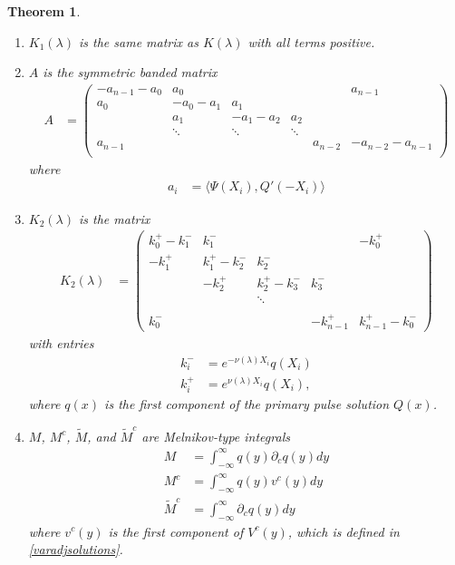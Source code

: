 \documentclass[11pt,reqno]{amsart}
\theoremstyle{plain}
\newtheorem{theorem}{Theorem}
\theoremstyle{definition}
\theoremstyle{remark}
\begin{document}
\begin{theorem}
\begin{enumerate}
\item $K_1(\lambda)$ is the same matrix as $K(\lambda)$ with all terms positive.

\item $A$ is the symmetric banded matrix
\begin{align}\label{Asymm}
A &= \begin{pmatrix}
-a_{n-1} - a_0 & a_0 & & &  & a_{n-1}\\
a_0 & -a_0 - a_1 &  a_1 \\
& a_1 & -a_1 - a_2 &  a_2 \\
& \ddots & \ddots & \ddots \\
a_{n-1} & & & & a_{n-2} & -a_{n-2} - a_{n-1} \\
\end{pmatrix}
\end{align}
where
\begin{align*}
a_i &= \langle \Psi(X_i), Q'(-X_i) \rangle
\end{align*}

\item $K_2(\lambda)$ is the matrix
\begin{align*}
K_2(\lambda) &= \begin{pmatrix}
k_0^+ - k_1^- & k_1^- &&& -k_0^+ \\
-k_1^+ & k_1^+ - k_2^- & k_2^- \\
& -k_2^+ & k_2^+ - k_3^- & k_3^- \\ && \ddots \\
\\
k_0^- &&& -k_{n-1}^+ & k_{n-1}^+ - k_0^- 
\end{pmatrix}
\end{align*}
with entries
\begin{align*}
k_i^- &= e^{-\nu(\lambda)X_i} q(X_i)\\
k_i^+ &= e^{\nu(\lambda)X_i} q(X_i),
\end{align*}
where $q(x)$ is the first component of the primary pulse solution $Q(x)$. 

\item $M$, $M^c$, $\tilde{M}$, and $\tilde{M}^c$ are  Melnikov-type integrals
\begin{align*}
M &= \int_{-\infty}^\infty q(y) \partial_c q(y) dy \\
M^c &= \int_{-\infty}^\infty q(y) v^c(y) dy \\
\tilde{M}^c &= \int_{-\infty}^\infty \partial_c q(y) dy
\end{align*}
where $v^c(y)$ is the first component of $V^c(y)$, which is defined in \cref{varadjsolutions}.


\end{enumerate}
\end{theorem}
\end{document}
